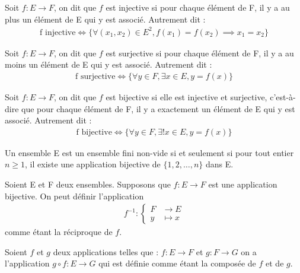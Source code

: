     \begin{definition}[Injectivité]
	Soit $f:E \to F$, on dit que $f$ est injective si pour chaque élément de F, il y a au plus un élément de E qui y est associé. Autrement dit :
	\begin{align*}
        \text{f injective} \iff \{\forall (x_1, x_2) \in E^2, f(x_1) = f(x_2) \implies x_1 = x_2\}	
	\end{align*}
\end{definition}

    \begin{definition}[Surjectivité]
	Soit $f:E \to F$, on dit que $f$ est surjective si pour chaque élément de F, il y a au moins un élément de E qui y est associé.
	Autrement dit :
	\begin{align*}
        \text{f surjective} \iff \{\forall y \in F, \exists x \in E, y = f(x)\}	
	\end{align*}
\end{definition}

    \begin{definition}[Bijectivité]
	Soit $f:E \to F$, on dit que $f$ est bijective si elle est injective et surjective, c'est-à-dire que pour chaque élément de F, il y a exactement un élément de E qui y est associé.
	Autrement dit :
	\begin{align*}
        \text{f bijective} \iff \{\forall y \in F, \exists! x \in E, y = f(x)\}	
	\end{align*}
\end{definition}

    \begin{definition}
    Un ensemble E est un ensemble fini non-vide si et seulement si pour tout entier $n \geq 1$, il existe une application bijective de $\{1, 2, \ldots, n\}$ dans E.
\end{definition}

    \begin{definition}
	Soient E et F deux ensembles. Supposons que $f:E \to F$ est une application bijective. On peut définir l'application 
	\begin{align*}
	    f^{-1} : 
		\begin{cases}
			F &\to E \\
			y &\mapsto x
    \end{cases}
	\end{align*}
	comme étant la réciproque de $f$.
\end{definition}

    \begin{definition}[Composition]
	Soient $f$ et $g$ deux applications telles que :
	$f:E \to F$ et $g:F \to G$ on a l'application $g \circ f : E \to G$ qui est définie comme étant la composée de $f$ et de $g$.
\end{definition}

